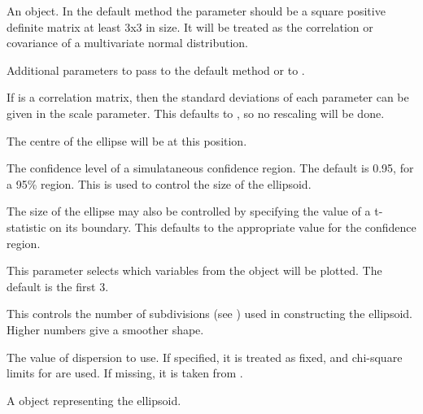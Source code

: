 \begin{Arguments}
\begin{ldescription}
\item[\code{x}] An object. In the default method the parameter  should be a 
square positive definite matrix at least 3x3
in size. It will be treated as the correlation or covariance 
of a multivariate normal distribution.

\item[\code{...}] Additional parameters to pass to the default method or to .

\item[\code{scale}] If  is a correlation matrix, then the standard deviations of each
parameter can be given in the scale parameter.  This defaults to ,
so no rescaling will be done.

\item[\code{centre}] The centre of the ellipse will be at this position.

\item[\code{level}] The confidence level of a simulataneous confidence region.  The default is
0.95, for a 95\% region.  This is used to control the size of the ellipsoid.

\item[\code{t}] The size of the ellipse may also be controlled by specifying the value
of a t-statistic on its boundary.  This defaults to the appropriate
value for the confidence region.

\item[\code{which}] This parameter selects which variables from the object will be
plotted.  The default is the first 3.

\item[\code{subdivide}] This controls the number of subdivisions (see )
used in constructing the ellipsoid.  Higher numbers give a smoother shape.

\item[\code{dispersion}] The value of dispersion to use.  If specified, it is treated as fixed,
and chi-square limits for  are used. If missing, it is 
taken from .

\end{ldescription}
\end{Arguments}
\begin{Value}
A  object representing the ellipsoid.
\end{Value}
